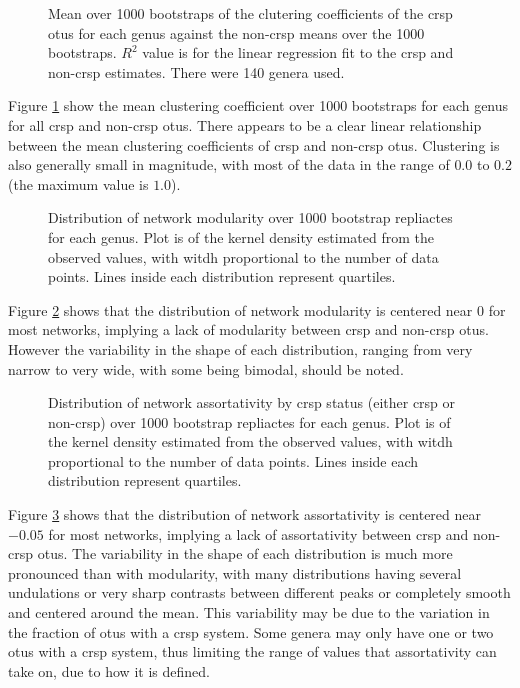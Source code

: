 \FloatBarrier
\begin{figure}[htb!]
    \caption{Mean over 1000 bootstraps of the clutering coefficients of the \ac{crsp} \ac{otu}s for each genus against the non-\ac{crsp} means over the 1000 bootstraps. $R^2$ value is for the linear regression fit to the \ac{crsp} and non-\ac{crsp} estimates. There were 140 genera used.}
    \label{ccnc}
\end{figure}
\FloatBarrier
Figure \ref{ccnc} show the mean clustering coefficient over 1000 bootstraps for each genus for all \ac{crsp} and non-\ac{crsp} \ac{otu}s.
There appears to be a clear linear relationship between the mean clustering coefficients of \ac{crsp} and non-\ac{crsp} \ac{otu}s.
Clustering is also generally small in magnitude, with most of the data in the range of $0.0$ to $0.2$ (the maximum value is $1.0$).

\FloatBarrier
\begin{figure}[htb!]
    \caption{Distribution of network modularity over 1000 bootstrap repliactes for each genus. Plot is of the kernel density estimated from the observed values, with witdh proportional to the number of data points. Lines inside each distribution represent quartiles.}
    \label{mod}
\end{figure}
\FloatBarrier
Figure \ref{mod} shows that the distribution of network modularity is centered near $0$ for most networks, implying a lack of modularity between \ac{crsp} and non-\ac{crsp} \ac{otu}s.
However the variability in the shape of each distribution, ranging from very narrow to very wide, with some being bimodal, should be noted.

\FloatBarrier
\begin{figure}[htb!]
    \caption{Distribution of network assortativity by \ac{crsp} status (either \ac{crsp} or non-\ac{crsp}) over 1000 bootstrap repliactes for each genus. Plot is of the kernel density estimated from the observed values, with witdh proportional to the number of data points. Lines inside each distribution represent quartiles.}
    \label{asst}
\end{figure}
\FloatBarrier
Figure \ref{asst} shows that the distribution of network assortativity is centered near $-0.05$ for most networks, implying a lack of assortativity between \ac{crsp} and non-\ac{crsp} \ac{otu}s.
The variability in the shape of each distribution is much more pronounced than with modularity, with many distributions having several undulations or very sharp contrasts between different peaks or completely smooth and centered around the mean.
This variability may be due to the variation in the fraction of \ac{otu}s with a \ac{crsp} system.
Some genera may only have one or two \ac{otu}s with a \ac{crsp} system, thus limiting the range of values that assortativity can take on, due to how it is defined.


